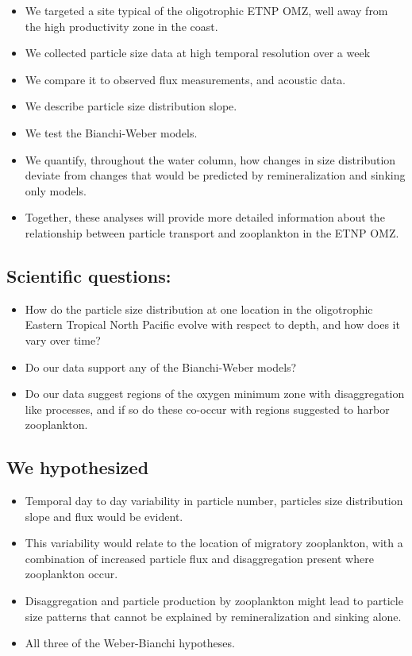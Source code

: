 \documentclass[]{article}
\providecommand{\tightlist}{%
  \setlength{\itemsep}{0pt}\setlength{\parskip}{0pt}}
\begin{document}
\begin{itemize}
  \begin{itemize}
  \tightlist
  \item
    We targeted a site typical of the oligotrophic ETNP OMZ, well away
    from the high productivity zone in the coast.
  \item
    We collected particle size data at high temporal resolution over a
    week
  \item
    We compare it to observed flux measurements, and acoustic data.
  \item
    We describe particle size distribution slope.
  \item
    We test the Bianchi-Weber models.
  \item
    We quantify, throughout the water column, how changes in size
    distribution deviate from changes that would be predicted by
    remineralization and sinking only models.
  \item
    Together, these analyses will provide more detailed information
    about the relationship between particle transport and zooplankton in
    the ETNP OMZ.
  \end{itemize}
\end{itemize}

\hypertarget{scientific-questions}{%
\subsection{Scientific questions:}\label{scientific-questions}}

\begin{itemize}
\tightlist
\item
  How do the particle size distribution at one location in the
  oligotrophic Eastern Tropical North Pacific evolve with respect to
  depth, and how does it vary over time?
\item
  Do our data support any of the Bianchi-Weber models?
\item
  Do our data suggest regions of the oxygen minimum zone with
  disaggregation like processes, and if so do these co-occur with
  regions suggested to harbor zooplankton.
\end{itemize}

\hypertarget{we-hypothesized}{%
\subsection{We hypothesized}\label{we-hypothesized}}

\begin{itemize}
\tightlist
\item
  Temporal day to day variability in particle number, particles size
  distribution slope and flux would be evident.
\item
  This variability would relate to the location of migratory
  zooplankton, with a combination of increased particle flux and
  disaggregation present where zooplankton occur.
\item
  Disaggregation and particle production by zooplankton might lead to
  particle size patterns that cannot be explained by remineralization
  and sinking alone.
\item
  All three of the Weber-Bianchi hypotheses.
\end{itemize}
\end{document}
